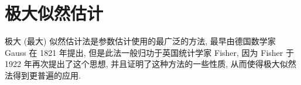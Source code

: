 

\section{极大似然估计}

极大 (最大) 似然估计法是参数估计使用的最广泛的方法, 最早由德国数学家 Gauss 在 1821 年提出,
但是此法一般归功于英国统计学家 Fisher, 因为 Fisher 于 1922 年再次提出了这个思想, 并且证明了这种方法的一些性质,
从而使得极大似然法得到更普遍的应用.

